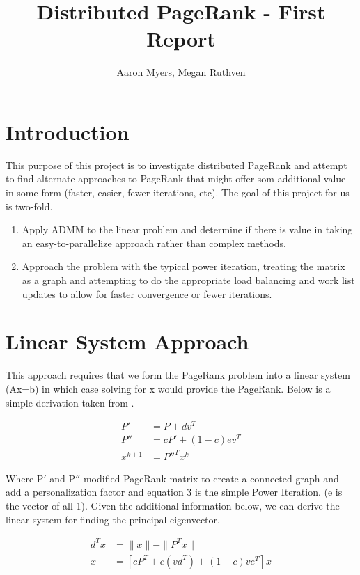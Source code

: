 \documentclass[a4paper,10pt]{article}
\title{Distributed PageRank - First Report}
\author{Aaron Myers, Megan Ruthven}
\begin{document}
\maketitle
\tableofcontents
\pagebreak

\section{Introduction}
This purpose of this project is to investigate distributed PageRank and attempt to find alternate approaches to PageRank that might offer som additional value in some form (faster, easier, fewer iterations, etc). The goal of this project for us is two-fold.
\begin{enumerate}
\item Apply ADMM \cite{ADMM} to the linear problem and determine if there is value in taking an easy-to-parallelize approach rather than complex methods.
\item Approach the problem with the typical power iteration, treating the matrix as a graph and attempting to do the appropriate load balancing and work list updates to allow for faster convergence or fewer iterations.
\end{enumerate}

\section{Linear System Approach}
This approach requires that we form the PageRank problem into a linear system (Ax=b) in which case solving for x would provide the PageRank. Below is a simple derivation taken from \cite{Fast Parallel}.
\begin{center}
\begin{align}
	P' &= P + dv^{T} \\
	P'' &= cP' + (1-c)ev^{T} \\
	x^{k+1} &= P''^{T}x^{k}
\end{align}

\end{center}
Where P$'$ and P$''$ modified PageRank matrix to create a connected graph and add a personalization factor and equation 3 is the simple Power Iteration. (e is the vector of all 1).
\newline
Given the additional information below, we can derive the linear system for finding the principal eigenvector.


\begin{center}
\begin{align}
  d^{T}x &= \| x\| - \| P^{T}x\| \\
  x &= [cP^{T} + c(vd^{T}) + (1-c)ve^{T}]x
\end{align}
\end{center}
\end{document}
